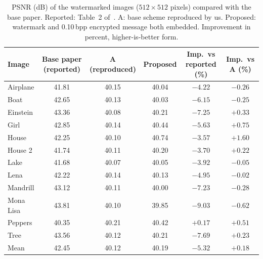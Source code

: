 \documentclass[11pt,a4paper]{article}
\begin{document}
\begin{table}[!htbp]
\centering\small
\caption{PSNR (dB) of the watermarked images ($512\times512$ pixels) compared with the base paper. Reported: Table~2 of~\cite{sanivarapu2022}. A: base scheme reproduced by us. Proposed: watermark and 0.10\,bpp encrypted message both embedded. Improvement in percent, higher-is-better form.}\label{tab:psnr}
\begin{tabular}{@{}lccccc@{}}
\toprule
Image & Base paper (reported) & A (reproduced) & Proposed & Imp.\ vs reported (\%) & Imp.\ vs A (\%) \\
\midrule
Airplane & 41.81 & 40.15 & 40.04 & $-4.22$ & $-0.26$ \\
Boat & 42.65 & 40.13 & 40.03 & $-6.15$ & $-0.25$ \\
Einstein & 43.36 & 40.08 & 40.21 & $-7.25$ & $+0.33$ \\
Girl & 42.85 & 40.14 & 40.44 & $-5.63$ & $+0.75$ \\
House & 42.25 & 40.10 & 40.74 & $-3.57$ & $+1.60$ \\
House 2 & 41.74 & 40.11 & 40.20 & $-3.70$ & $+0.22$ \\
Lake & 41.68 & 40.07 & 40.05 & $-3.92$ & $-0.05$ \\
Lena & 42.22 & 40.14 & 40.13 & $-4.95$ & $-0.02$ \\
Mandrill & 43.12 & 40.11 & 40.00 & $-7.23$ & $-0.28$ \\
Mona Lisa & 43.81 & 40.10 & 39.85 & $-9.03$ & $-0.62$ \\
Peppers & 40.35 & 40.21 & 40.42 & $+0.17$ & $+0.51$ \\
Tree & 43.56 & 40.12 & 40.21 & $-7.69$ & $+0.23$ \\
\midrule
Mean & 42.45 & 40.12 & 40.19 & $-5.32$ & $+0.18$ \\
\bottomrule
\end{tabular}
\end{table}
\end{document}
